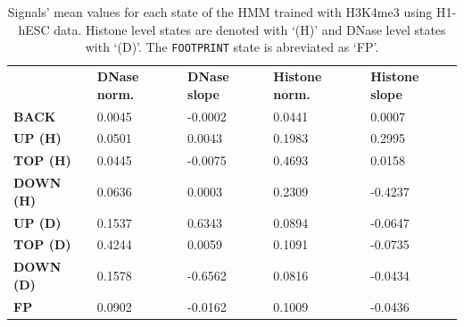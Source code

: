 \documentclass{bioinfo}
\begin{document}
\begin{table}[t]
\begin{center}
\caption{Signals' mean values for each state of the HMM trained with H3K4me3 using H1-hESC data. Histone level states are denoted with `(H)' and DNase level states with `(D)'. The {\tt FOOTPRINT} state is abreviated as `FP'.}
\label{tab:hmmmean}
    \renewcommand{\arraystretch}{1.2}
    \begin{tabular}{ lllll }
        \hline
        & \textbf{DNase norm.} & \textbf{DNase slope} & \textbf{Histone norm.} & \textbf{Histone slope} \\
        \textbf{BACK}     & 0.0045 & -0.0002 & 0.0441 & 0.0007  \\
        \textbf{UP (H)}   & 0.0501 & 0.0043  & 0.1983 & 0.2995  \\
        \textbf{TOP (H)}  & 0.0445 & -0.0075 & 0.4693 & 0.0158  \\
        \textbf{DOWN (H)} & 0.0636 & 0.0003  & 0.2309 & -0.4237 \\
        \textbf{UP (D)}   & 0.1537 & 0.6343  & 0.0894 & -0.0647 \\
        \textbf{TOP (D)}  & 0.4244 & 0.0059  & 0.1091 & -0.0735 \\
        \textbf{DOWN (D)} & 0.1578 & -0.6562 & 0.0816 & -0.0434 \\
        \textbf{FP}       & 0.0902 & -0.0162 & 0.1009 & -0.0436 \\
        \hline
    \end{tabular}
\end{center}
\end{table}
\end{document}
